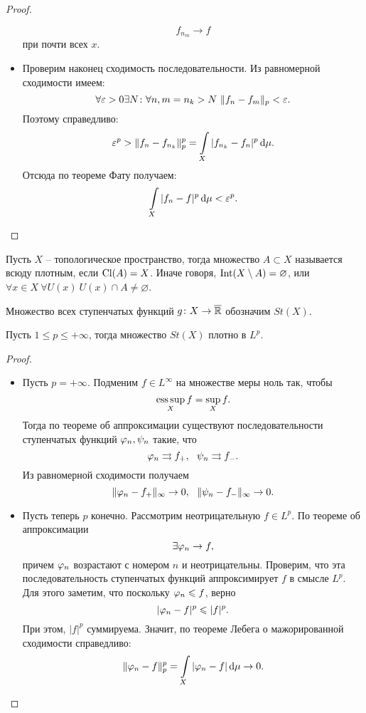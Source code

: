 \begin{proof}
\begin{itemize}
            \[
                f_{n_m} \to f
            \]
            при почти всех $x$.
        \item Проверим наконец сходимость последовательности. Из равномерной 
            сходимости имеем:
            \[
                \forall \varepsilon > 0 \exists N \colon \forall n, m = n_k > N~
                \lVert f_n - f_m\rVert_p < \varepsilon
            .\]
            Поэтому справедливо:
            \[
                \varepsilon^p > \lVert f_n - f_{n_k}\rVert^p_p = \int\limits_X{|f_{n_k} - f_n|^p \,\mathrm{d} \mu}
            .\]
            Отсюда по теореме Фату получаем:
            \[
                \int\limits_X{|f_n - f|^p \,\mathrm{d} \mu} < \varepsilon^p
            .\]
    \end{itemize}
\end{proof}

\begin{definition}
    Пусть $X$ -- топологическое пространство, тогда множество
    $A \subset X$ называется всюду плотным, если $\operatorname{Cl}(A) = X$.
    Иначе говоря, $\operatorname{Int}(X \setminus A) = \varnothing$, 
    или \\ $\forall x \in X~ \forall U(x)~ U(x) \cap A \neq \varnothing$.
\end{definition}

\begin{definition}
    Множество всех ступенчатых функций $g \colon X \to \overline{\mathbb{R}}$
    обозначим $St(X)$.
\end{definition}

\begin{lemma}
    Пусть $1 \leqslant p \leqslant +\infty$, тогда множество
    $St(X)$ плотно в $L^p$.
\end{lemma}
\begin{proof}
    \enewline
    \begin{itemize}
        \item Пусть $p = +\infty$. Подменим $f \in L^\infty$ на
            множестве меры ноль так, чтобы
            \[
                \operatorname*{ess\,sup}_X{f} = \sup_X{f}
            .\]
            Тогда по теореме об аппроксимации существуют последовательности 
            ступенчатых функций $\varphi_n, \psi_n$ такие, что
            \[
                \varphi_n \rightrightarrows f_+,~~ \psi_n \rightrightarrows f_-
            .\]
            Из равномерной сходимости получаем
            \[
                \lVert\varphi_n - f_+\rVert_\infty \to 0,~~ \lVert\psi_n - f_-\rVert_\infty \to 0
            .\]
        \item Пусть теперь $p$ конечно. Рассмотрим неотрицательную $f \in L^p$.
            По теореме об аппроксимации
            \[
                \exists \varphi_n \to f
            ,\]
            причем $\varphi_n$ возрастают с номером $n$ и неотрицательны. Проверим,
            что эта последовательность ступенчатых функций аппроксимирует
            $f$ в смысле $L^p$. Для этого заметим, что поскольку $\varphi_n \leqslant f$,
            верно
            \[
                |\varphi_n - f|^p \leqslant |f|^p
            .\]
            При этом, $|f|^p$ суммируема. Значит, по теореме Лебега о
            мажорированной сходимости справедливо:
            \[
                \lVert\varphi_n - f\rVert^p_p = \int\limits_X{|\varphi_n - f| \,\mathrm{d} \mu} \to 0
            .\]
    \end{itemize}
\end{proof}

